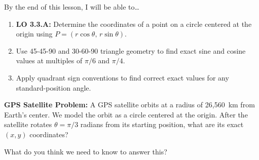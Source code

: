 \documentclass[10pt]{article}
\begin{document}
\namedateperiod

\vspace{0.1in}

\begin{objectivebox}
By the end of this lesson, I will be able to\ldots
\begin{enumerate}[itemsep=3pt]
  \item \textbf{LO 3.3.A:} Determine the coordinates of a point on a circle centered at the origin using $P = (r\cos\theta,\, r\sin\theta)$.
  \item Use 45-45-90 and 30-60-90 triangle geometry to find exact sine and cosine values at multiples of $\pi/6$ and $\pi/4$.
  \item Apply quadrant sign conventions to find correct exact values for any standard-position angle.
\end{enumerate}
\end{objectivebox}

\vspace{0.08in}

\begin{vocabbox}
\end{vocabbox}

\vspace{0.08in}

\begin{hookbox}
\textbf{GPS Satellite Problem:} A GPS satellite orbits at a radius of 26{,}560~km from Earth's center.
We model the orbit as a circle centered at the origin.
After the satellite rotates $\theta = \pi/3$ radians from its starting position, what are its exact $(x, y)$ coordinates?

\smallskip
What do you think we need to know to answer this?

\vspace{0.4in}
\end{hookbox}

\vspace{0.08in}
\end{document}
